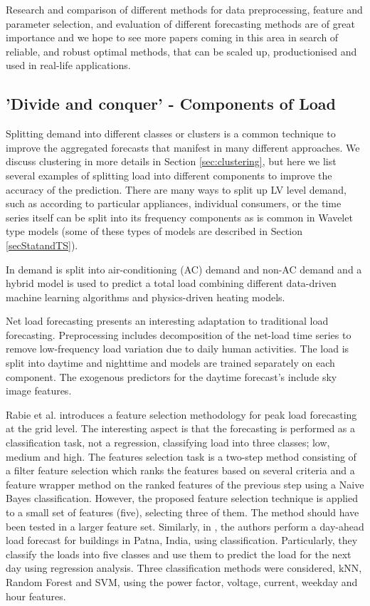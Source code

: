 Research and comparison of different methods for data preprocessing, feature and parameter selection, and evaluation of different forecasting methods are of great importance and we hope to see more papers coming in this area in search of reliable, and robust optimal methods, that can be scaled up, productionised and used in real-life applications.


\subsection{'Divide and conquer' - Components of Load}
Splitting demand into different classes or clusters is a common technique to improve the aggregated forecasts that manifest in many different approaches. We discuss clustering in more details in Section \ref{sec:clustering}, but here we list several examples of splitting load into different components to improve the accuracy of the prediction. There are many ways to split up LV level demand, such as according to particular appliances, individual consumers, or the time series itself can be split into its frequency components as is common in Wavelet type models (some of these types of models are described in Section \ref{secStatandTS}). 

In \cite{dong2016ahm} demand is split into air-conditioning (AC) demand and non-AC demand and a hybrid model is used to predict a total load combining different data-driven machine learning algorithms and physics-driven heating models. 

Net load forecasting \cite{chu2017nlf} presents an interesting adaptation to traditional load forecasting. Preprocessing includes decomposition of the net-load time series to remove low-frequency load variation due to daily human activities. The load is split into daytime and nighttime and models are trained separately on each component. The exogenous predictors for the daytime forecast's include sky image features.  

Rabie et al. \cite{rabie2019afb} introduces a feature selection methodology 
for peak load forecasting at the grid level. The interesting aspect is that the forecasting is performed as a classification task, not a regression, classifying load into three classes; low, medium and high. The features selection task is a two-step method consisting of a filter feature selection which ranks the features based on several criteria and a feature wrapper method on the ranked features of the previous step using a Naive Bayes classification. However, the proposed feature selection technique is applied to a small set of features (five), selecting three of them. The method should have been tested in a larger feature set.
Similarly, in \cite{vats2020meo}, the authors perform a day-ahead load forecast for buildings in Patna, India, using classification. Particularly, they classify the loads into five classes and use them to predict the load for the next day using regression analysis. Three classification methods were considered, kNN, Random Forest and SVM, using the power factor, voltage, current, weekday and hour features.

